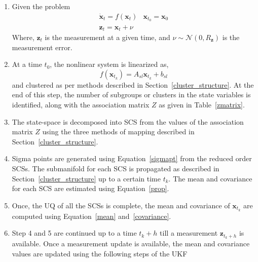 \begin{enumerate}
\item Given the problem 
\begin{equation}
\label{scs_meas_eqn}
\begin{array}{lr}
\dot{\textbf{x}}_t = f(\textbf{x}_t) & \textbf{x}_{t_0} = \textbf{x}_0 \\
\textbf{z}_t = \textbf{x}_t + \nu
\end{array}
\end{equation}
Where, $\textbf{z}_t$ is the measurement at a given time, and $\nu \sim \mathcal{N}(0,R_{\textbf{z}})$ is the measurement error.

\item At a time $t_0$, the nonlinear system is linearized as, 
\begin{equation}
f(\textbf{x}_{t_k}) = A_{sl}\textbf{x}_{t_k} + b_{sl}
\end{equation}
and clustered as per methods described in Section~\ref{cluster_structure}. At the end of this step, the number of subgroups or clusters in the state variables is identified, along with the association matrix $Z$ as given in Table~\ref{zmatrix}. 

\item The state-space is decomposed into SCS from the values of the association matrix $Z$ using the three methods of mapping described in Section~\ref{cluster_structure}.

\item Sigma points are generated using Equation~\ref{sigmapt} from the reduced order SCSs. The submanifold for each SCS is propagated as described in Section~\ref{cluster_structure} up to a certain time $t_k$. The mean and covariance for each SCS are estimated using Equation~\ref{prop}.

\item Once, the UQ of all the SCSs is complete, the mean and covariance of $\textbf{x}_{t_k}$ are computed using Equation~\ref{mean} and~\ref{covariance}.

\item Step 4 and 5 are continued up to a time $t_k + h$ till a measurement $\textbf{z}_{t_k + h}$ is available. Once a measurement update is available, the mean and covariance values are updated using the following steps of the UKF


\end{enumerate}
